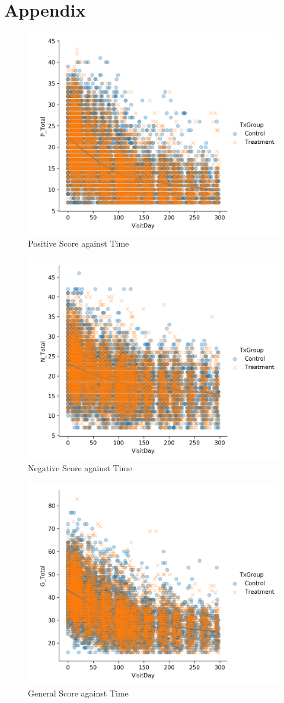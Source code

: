 \documentclass[11pt]{article}
\begin{document}
	\section{Appendix}
	\begin{figure}[H]
		\centering
		\includegraphics[width=0.7\linewidth]{figures/lwlm_te_P_Total.png}
		\caption{Positive Score against Time}
	\end{figure}
	
	\begin{figure}[H]
		\centering
		\includegraphics[width=0.7\linewidth]{figures/lwlm_te_N_Total.png}
		\caption{Negative Score against Time}
	\end{figure}
	
	\begin{figure}[H]
		\centering
		\includegraphics[width=0.7\linewidth]{figures/lwlm_te_G_Total.png}
		\caption{General Score against Time}
	\end{figure}
	
\end{document}

